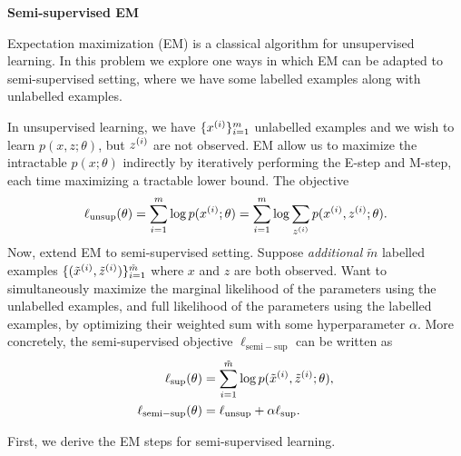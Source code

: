 \documentclass[12pt,letterpaper,boxed]{hmcpset}
\newcommand{\lunsup}{\ell_{\mathrm{unsup}}}
\newcommand{\lsup}{\ell_{\mathrm{sup}}}
\newcommand{\lsemi}{\ell_{\mathrm{semi-sup}}}
\begin{document}
\begin{problem}[Problem 4]
  \textbf{Semi-supervised EM}

  Expectation maximization (EM) is a classical algorithm for unsupervised learning. In this problem we explore one ways in which EM can be adapted to semi-supervised setting, where we have some labelled examples along with unlabelled examples.

  In unsupervised learning, we have $\{\xx\}_{i=1}^m$ unlabelled examples and we wish to learn $p(x, z; \theta)$, but $\zz$ are not observed. EM allow us to maximize the intractable $p(x; \theta)$ indirectly by iteratively performing the E-step and M-step, each time maximizing a tractable lower bound. The objective
  \[
  \begin{aligned}
    \ell_{\mathrm{unsup}}(\theta) = \sum_{i=1}^m \log p(\xx; \theta) = \sum_{i=1}^m \log \sum_{\zz} p(\xx, \zz; \theta).
  \end{aligned}
  \]
  Now, extend EM to semi-supervised setting. Suppose \emph{additional} $\tilde{m}$ labelled examples $\{(\txx, \tzz)\}_{i=1}^{\tilde{m}}$ where $x$ and $z$ are both observed. Want to simultaneously maximize the marginal likelihood of the parameters using the unlabelled examples, and full likelihood of the parameters using the labelled examples, by optimizing their weighted sum with some hyperparameter $\alpha$. More concretely, the semi-supervised objective $\lsemi$ can be written as 
  \[
  \begin{aligned}
    \lsup(\theta) &= \sum_{i=1}^{\tilde{m}} \log p(\txx, \tzz; \theta), \\
    \lsemi(\theta) &= \lunsup + \alpha \lsup.
  \end{aligned}
  \]
\end{problem}

\begin{solution}
  First, we derive the EM steps for semi-supervised learning.  
\end{solution}
\end{document}
